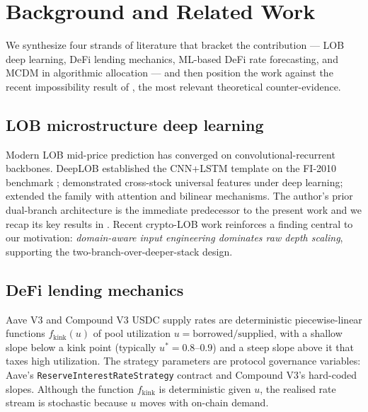 \section{Background and Related Work}
\label{sec:background}

We synthesize four strands of literature that bracket the contribution
--- LOB deep learning, DeFi lending mechanics, ML-based DeFi rate
forecasting, and MCDM in algorithmic allocation --- and then position
the work against the recent impossibility result of
\cite{halpern2024fair}, the most relevant theoretical counter-evidence.

\subsection{LOB microstructure deep learning}
\label{sec:bg-lob}

Modern LOB mid-price prediction has converged on convolutional-recurrent
backbones. DeepLOB \cite{zhang2019deeplob} established the
CNN+LSTM template on the FI-2010 benchmark \cite{ntakaris2018benchmark};
\cite{sirignano2019universal} demonstrated cross-stock universal features
under deep learning; \cite{tsantekidis2017using, briola2021deep,
tran2018temporal} extended the family with attention and bilinear
mechanisms. The author's prior dual-branch architecture
\cite{solovev2026lob} is the immediate predecessor to the present work
and we recap its key results in . Recent crypto-LOB
work \cite{briola2025microstructure, lit2025limit} reinforces a finding
central to our motivation: \emph{domain-aware input engineering
dominates raw depth scaling}, supporting the
two-branch-over-deeper-stack design.

\subsection{DeFi lending mechanics}
\label{sec:bg-defi-mechanics}

Aave V3 and Compound V3 USDC supply rates are deterministic
piecewise-linear functions $f_{\text{kink}}(u)$ of pool utilization
$u = \text{borrowed} / \text{supplied}$, with a shallow slope below a
kink point (typically $u^{*} = 0.8$--$0.9$) and a steep slope above it
that taxes high utilization. The strategy parameters are protocol
governance variables: Aave's \texttt{ReserveInterestRateStrategy}
contract and Compound V3's hard-coded slopes. Although the function
$f_{\text{kink}}$ is deterministic given $u$, the realised rate stream
is stochastic because $u$ moves with on-chain demand.

